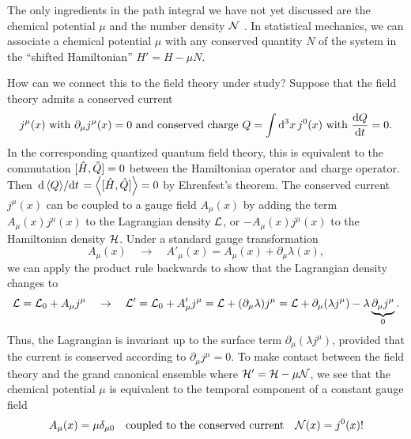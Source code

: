 The only ingredients in the path integral we have not yet discussed are the chemical potential $\mu$ and the number density $\mathcal{N}$ .
In statistical mechanics, we can associate a chemical potential $\mu$ with any conserved quantity $N$ of the system in the ``shifted Hamiltonian'' $H' = H - \mu N$.

How can we connect this to the field theory under study?
Suppose that the field theory admits a conserved current
\begin{equation}
	j^\mu(x)
	\text{ with }
	\partial_\mu j^\mu(x) = 0
	\text{ and conserved charge }
	Q = \int \dif^3 x \, j^0(x)
	\text{ with }
	\odv{Q}{t} = 0.
\end{equation}
In the corresponding quantized quantum field theory, this is equivalent to the commutation $[ \hat{H} , \hat{Q} ] = 0$ between the Hamiltonian operator and charge operator.
Then $\odv{\thermalavg{Q}}/{t} = \thermalavg{\comm{\hat{H}}{\hat{Q}}} = 0$ by Ehrenfest's theorem.
The conserved current $j^\mu(x)$ can be coupled to a gauge field $A_\mu(x)$ by adding the term $A_\mu(x) j^\mu(x)$ to the Lagrangian density $\mathcal{L}$, or $-A_\mu(x) j^\mu(x)$ to the Hamiltonian density $\mathcal{H}$.
Under a standard gauge transformation
\begin{equation}
	A_\mu(x) \quad \rightarrow \quad A'_\mu(x) = A_\mu(x) + \partial_\mu \lambda(x) ,
\label{eq:tft:gauge_transformation}
\end{equation}
we can apply the product rule backwards to show that the Lagrangian density changes to
\begin{equation}
	\mathcal{L} = \mathcal{L}_0 + A_\mu j^\mu \quad \rightarrow \quad \mathcal{L}' = \mathcal{L}_0 + A'_\mu j^\mu
	                                                             = \mathcal{L}   + (\partial_\mu \lambda) j^\mu
	                                                             = \mathcal{L}   + \partial_\mu (\lambda j^\mu) - \lambda \underbrace{\partial_\mu j^\mu}_0 .
\end{equation}
Thus, the Lagrangian is invariant up to the surface term $\partial_\mu (\lambda j^\mu)$, provided that the current is conserved according to $\partial_\mu j^\mu = 0$. 
To make contact between the field theory and the grand canonical ensemble where $\mathcal{H}' = \mathcal{H} - \mu \mathcal{N}$, we see that the chemical potential $\mu$ is equivalent to the temporal component of a constant gauge field
\begin{equation}
	A_\mu(x) = \mu \delta_{\mu 0} 
	\quad \text{coupled to the conserved current} \quad
	\mathcal{N}(x) = j^0(x)!
\label{eq:tft:chemical_potential}
\end{equation}

